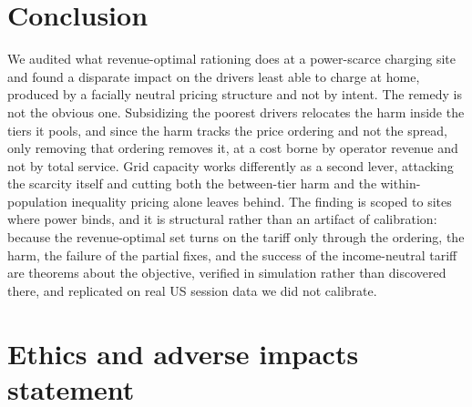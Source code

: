 \documentclass[manuscript, screen, review, anonymous]{acmart}
\begin{document}
\section{Conclusion}

We audited what revenue-optimal rationing does at a power-scarce charging site and found a disparate impact on the drivers least able to charge at home, produced by a facially neutral pricing structure and not by intent. The remedy is not the obvious one. Subsidizing the poorest drivers relocates the harm inside the tiers it pools, and since the harm tracks the price ordering and not the spread, only removing that ordering removes it, at a cost borne by operator revenue and not by total service. Grid capacity works differently as a second lever, attacking the scarcity itself and cutting both the between-tier harm and the within-population inequality pricing alone leaves behind. The finding is scoped to sites where power binds, and it is structural rather than an artifact of calibration: because the revenue-optimal set turns on the tariff only through the ordering, the harm, the failure of the partial fixes, and the success of the income-neutral tariff are theorems about the objective, verified in simulation rather than discovered there, and replicated on real US session data we did not calibrate.

\section*{Ethics and adverse impacts statement}
\end{document}
